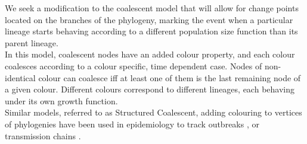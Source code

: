\documentclass{report}
\theoremstyle{definition}
\begin{document}
We seek a modification to the coalescent model that will allow for change points located on the branches of the phylogeny, marking the event when a particular lineage starts behaving according to a different population size function than its parent lineage.\\

In this model, coalescent nodes have an added colour property, and each colour coalesces according to a colour specific, time dependent case. Nodes of non-identical colour can coalesce iff at least one of them is the last remaining node of a given colour.
Different colours correspond to different lineages, each behaving under its own growth function.\\

Similar models, referred to as Structured Coalescent, adding colouring to vertices of phylogenies have been used in epidemiology to track outbreaks \cite{maio_scotti_2016}, or transmission chains \cite{didelot_genomic_2017}.
\end{document}
